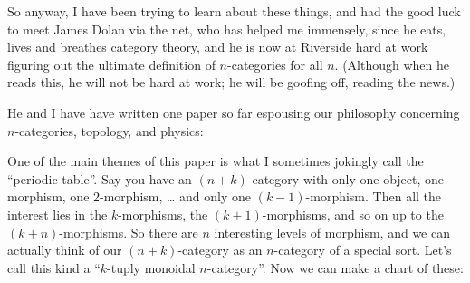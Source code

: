 \documentclass[12pt]{article}
\def\tightlist{}
\renewcommand{\texttt}[1]{%
  \begingroup
  \ttfamily
  \begingroup\lccode`~=`/\lowercase{\endgroup\def~}{/\discretionary{}{}{}}%
  \begingroup\lccode`~=`[\lowercase{\endgroup\def~}{[\discretionary{}{}{}}%
  \begingroup\lccode`~=`.\lowercase{\endgroup\def~}{.\discretionary{}{}{}}%
  \catcode`/=\active\catcode`[=\active\catcode`.=\active
  \scantokens{#1\noexpand}%
  \endgroup
}
\begin{document}
So anyway, I have been trying to learn about these things, and had the
good luck to meet James Dolan via the net, who has helped me immensely,
since he eats, lives and breathes category theory, and he is now at
Riverside hard at work figuring out the ultimate definition of
\(n\)-categories for all \(n\). (Although when he reads this, he will
not be hard at work; he will be goofing off, reading the news.)

He and I have have written one paper so far espousing our philosophy
concerning \(n\)-categories, topology, and physics:


One of the main themes of this paper is what I sometimes jokingly call
the ``periodic table''. Say you have an \((n+k)\)-category with only one
object, one morphism, one \(2\)-morphism, \ldots{} and only one
\((k-1)\)-morphism. Then all the interest lies in the \(k\)-morphisms,
the \((k+1)\)-morphisms, and so on up to the \((k+n)\)-morphisms. So
there are \(n\) interesting levels of morphism, and we can actually
think of our \((n+k)\)-category as an \(n\)-category of a special sort.
Let's call this kind a ``\(k\)-tuply monoidal \(n\)-category''. Now we
can make a chart of these:
\end{document}
